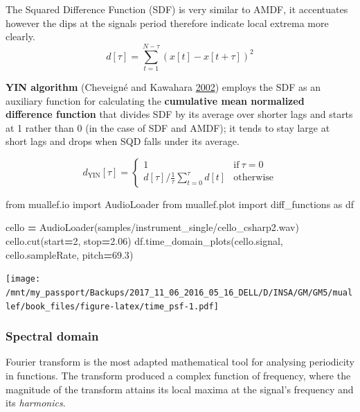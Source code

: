 \documentclass[
  american,
]{article}
\newenvironment{Shaded}{\begin{snugshade}}{\end{snugshade}}
\newcommand{\DecValTok}[1]{\textcolor[rgb]{0.00,0.00,0.81}{#1}}
\newcommand{\FloatTok}[1]{\textcolor[rgb]{0.00,0.00,0.81}{#1}}
\newcommand{\ImportTok}[1]{#1}
\newcommand{\NormalTok}[1]{#1}
\newcommand{\OperatorTok}[1]{\textcolor[rgb]{0.81,0.36,0.00}{\textbf{#1}}}
\newcommand{\StringTok}[1]{\textcolor[rgb]{0.31,0.60,0.02}{#1}}
\begin{document}
The Squared Difference Function (SDF) is very similar to AMDF,
it accentuates however the dips at the signals period
therefore indicate local extrema more clearly.
\[d[\tau] = \sum_{t=1}^{N-\tau}(x[t]-x[t+\tau])^2\]

\textbf{YIN algorithm} (Cheveigné and Kawahara \protect\hyperlink{ref-yin_2002}{2002}) employs the SDF as an auxiliary
function for calculating the \textbf{cumulative mean normalized
difference function} that divides SDF by its average
over shorter lags and starts at 1 rather than 0 (in the case
of SDF and AMDF); it tends to stay large at short lags
and drops when SQD falls under its average.

\[d_{\text{YIN}}[\tau] = \begin{cases}
    1 &\text{if}~\tau = 0\\
    d[\tau] / \frac{1}{\tau}\sum\limits_{t=0}^{\tau} d[t]
        &\text{otherwise}
\end{cases}\]

\begin{Shaded}
\begin{Highlighting}[]
\ImportTok{from}\NormalTok{ muallef.io }\ImportTok{import}\NormalTok{ AudioLoader}
\ImportTok{from}\NormalTok{ muallef.plot }\ImportTok{import}\NormalTok{ diff\_functions }\ImportTok{as}\NormalTok{ df}

\NormalTok{cello }\OperatorTok{=}\NormalTok{ AudioLoader(}\StringTok{\textquotesingle{}samples/instrument\_single/cello\_csharp2.wav\textquotesingle{}}\NormalTok{)}
\NormalTok{cello.cut(start}\OperatorTok{=}\DecValTok{2}\NormalTok{, stop}\OperatorTok{=}\FloatTok{2.06}\NormalTok{)}
\NormalTok{df.time\_domain\_plots(cello.signal, cello.sampleRate, pitch}\OperatorTok{=}\FloatTok{69.3}\NormalTok{)}
\end{Highlighting}
\end{Shaded}

\texttt{[image: /mnt/my\_passport/Backups/2017\_11\_06\_2016\_05\_16\_DELL/D/INSA/GM/GM5/muallef/book\_files/figure-latex/time\_psf-1.pdf]}

\hypertarget{spectral-domain}{%
\subsubsection{Spectral domain}\label{spectral-domain}}

Fourier transform is the most adapted mathematical tool
for analysing periodicity in functions.
The transform produced a complex function of frequency,
where the magnitude of the transform attains its local
maxima at the signal's frequency and its \emph{harmonics}.
\end{document}
